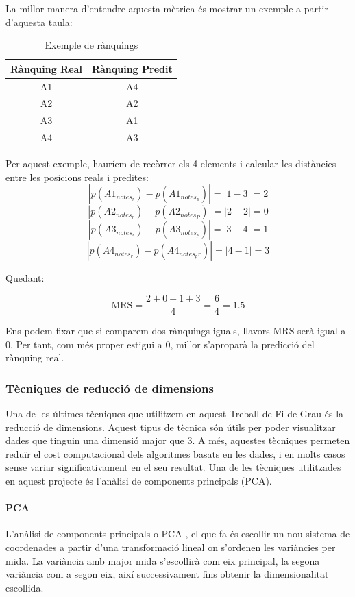 \documentclass[12pt,a4paper,catalan]{article}
\begin{document}
La millor manera d'entendre aquesta mètrica és mostrar un exemple a partir d'aquesta taula:

\begin{table}[h]
\centering
\begin{tabular}{@{}cc@{}}
\toprule
Rànquing Real & Rànquing Predit \\ \midrule
A1           & A4             \\
A2           & A2             \\
A3           & A1             \\
A4           & A3             \\ \bottomrule
\end{tabular}
\caption{Exemple de rànquings}
\end{table}

Per aquest exemple, hauríem de recòrrer els 4 elements i calcular les distàncies entre les posicions reals i predites:
	$$\left|p(A1_{notes_r}) - p(A1_{notes_p})\right| = \left| 1 - 3 \right| = 2$$
	$$\left|p(A2_{notes_r}) - p(A2_{notes_P})\right| = \left| 2 - 2 \right| = 0$$
	$$\left|p(A3_{notes_r}) - p(A3_{notes_p})\right| = \left| 3 - 4 \right| = 1$$
	$$\left|p(A4_{notes_r}) - p(A4_{notes_pr})\right| = \left| 4 - 1 \right| = 3$$

Quedant:

$$ \mathrm{MRS} = \frac{2 + 0 + 1 + 3}{4} = \frac{6}{4} = 1.5$$

Ens podem fixar que si comparem dos rànquings iguals, llavors $\mathrm{MRS}$ serà igual a $0$. Per tant, com més proper estigui a 0, millor s'aproparà la predicció del rànquing real.

\subsubsection{Tècniques de reducció de dimensions}
Una de les últimes tècniques que utilitzem en aquest Treball de Fi de Grau és la reducció de dimensions. Aquest tipus de tècnica són útils per poder visualitzar dades que tinguin una dimensió major que 3. A més, aquestes tècniques permeten reduïr el cost computacional dels algoritmes basats en les dades, i en molts casos sense variar significativament en el seu resultat. Una de les tècniques utilitzades en aquest projecte és l'anàlisi de components principals (PCA).

\paragraph{PCA}
L'anàlisi de components principals o PCA \cite{pca}, el que fa és escollir un nou sistema de coordenades a partir d'una transformació lineal on s'ordenen les variàncies per mida. La variància amb major mida s'escollirà com eix principal, la segona variància com a segon eix, així successivament fins obtenir la dimensionalitat escollida.
\end{document}
